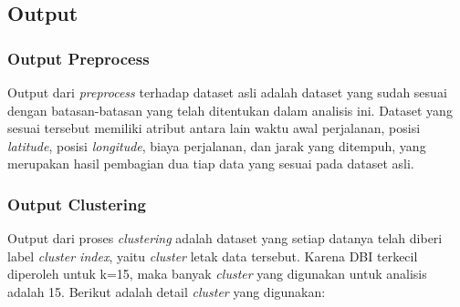 \documentclass{article}
\begin{document}
\subsection{Output}

\subsubsection{Output Preprocess}

\begin{adjustwidth}{4em}{0pt}
	
	\hspace{\parindent}Output dari \textit{preprocess} terhadap dataset asli adalah dataset yang sudah sesuai dengan batasan-batasan yang telah ditentukan dalam analisis ini. Dataset yang sesuai tersebut memiliki atribut antara lain waktu awal perjalanan, posisi \textit{latitude}, posisi \textit{longitude}, biaya perjalanan, dan jarak yang ditempuh, yang merupakan hasil pembagian dua tiap data yang sesuai pada dataset asli.

\end{adjustwidth}

\subsubsection{Output Clustering}

\begin{adjustwidth}{4em}{0pt}
	
	\hspace{\parindent}Output dari proses \textit{clustering} adalah dataset yang setiap datanya telah diberi label \textit{cluster index}, yaitu \textit{cluster} letak data tersebut. Karena DBI terkecil diperoleh untuk k=15, maka banyak \textit{cluster} yang digunakan untuk analisis adalah 15. Berikut adalah detail \textit{cluster} yang digunakan:

\end{adjustwidth}
\end{document}
